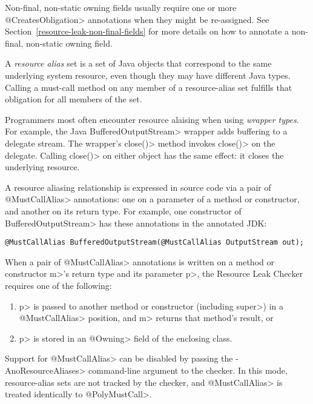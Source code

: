 Non-final, non-static owning fields usually require one or more \<@CreatesObligation> annotations
when they might be re-assigned. See Section~\ref{resource-leak-non-final-fields} for
more details on how to annotate a non-final, non-static owning field.



A \emph{resource alias} set is a set of Java objects that
correspond to the same underlying system resource,
even though they may have different Java types.
Calling a must-call method on any member of a resource-alias set
fulfills that obligation for all members of the set.

Programmers most often encounter resource alaising when using \emph{wrapper types}.
For example, the Java \<BufferedOutputStream> wrapper adds buffering to a
delegate stream.
The wrapper's \<close()> method invokes \<close()> on the delegate.  Calling
\<close()> on either object has the same effect:  it closes the underlying resource.

A resource aliasing relationship is expressed in source code via a pair of \<@MustCallAlias> annotations:
one on a parameter of a method or constructor, and another on its return type.
For example, one constructor of \<BufferedOutputStream> has these annotations in
the annotated JDK:
\begin{Verbatim}
@MustCallAlias BufferedOutputStream(@MustCallAlias OutputStream out);
\end{Verbatim}

When a pair of \<@MustCallAlias> annotations is written on a method or constructor \<m>'s return type
and its parameter \<p>, the Resource Leak Checker requires one of the following:
\begin{enumerate}
\item \<p> is passed to another method or constructor (including \<super>) in a
  \<@MustCallAlias> position, and \<m> returns that method's result, or
\item \<p> is stored in an \<@Owning> field of the enclosing class.
\end{enumerate}

Support for \<@MustCallAlias> can be disabled by passing the \<-AnoResourceAliases> command-line
argument to the checker. In this mode, resource-alias sets are not tracked by the checker,
and \<@MustCallAlias> is treated identically to \<@PolyMustCall>.



